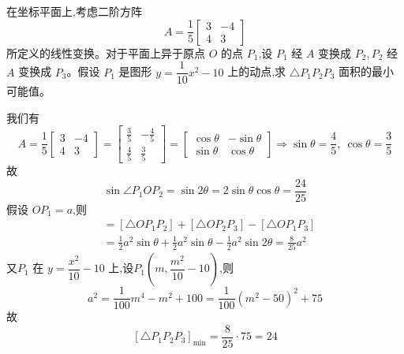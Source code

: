 \begin{questions}
    \question 在坐标平面上,考虑二阶方阵 
    \[
    A=\frac{1}{5}\begin{bmatrix}3&-4\\ 4&3\end{bmatrix}
    \]
    所定义的线性变换。对于平面上异于原点 $O$ 的点 $P_1$,设 $P_1$ 经 $A$ 变换成 $P_2,P_2$ 经 $A$ 变换成 $P_3$。假设 $P_1$ 是图形 $y=\dfrac{1}{10}x^{2}-10$ 上的动点,求 $\triangle P_1P_2P_3$ 面积的最小可能值。
    \begin{solution}
        我们有
        \[
        A = \frac{1}{5}\begin{bmatrix}3 & -4 \\ 4 & 3 \end{bmatrix} 
        = \begin{bmatrix} \frac{3}{5} & -\frac{4}{5} \\ \frac{4}{5} & \frac{3}{5} \end{bmatrix} 
        = \begin{bmatrix} \cos\theta & -\sin\theta \\ \sin\theta & \cos\theta \end{bmatrix}
        \Rightarrow \sin \theta = \frac{4}{5},\ \cos \theta = \frac{3}{5}
        \]
        故
        \[
        \sin \angle P_1OP_2 = \sin 2\theta = 2\sin\theta\cos\theta = \frac{24}{25}
        \]
        假设 $OP_1=a$,则
        \begin{align*}
        [\triangle P_1P_2P_3] &= [\triangle OP_1P_2] + [\triangle OP_2P_3] - [\triangle OP_1P_3]\\
        &= \frac{1}{2}a^2 \sin \theta + \frac{1}{2}a^2 \sin \theta - \frac{1}{2}a^2 \sin 2\theta 
        = \frac{8}{25}a^2
        \end{align*}
        又$P_1$  在 $y = \dfrac{x^2}{10} - 10$ 上,设$P_1\left(m, \dfrac{m^2}{10} - 10\right)$,则
        \[
        a^2 = \frac{1}{100}m^4 - m^2 + 100 = \frac{1}{100}(m^2 - 50)^2 + 75
        \]
        故
        \[
        [\triangle P_1P_2P_3]_{\min}=\frac{8}{25} \cdot 75=24
        \]
    \end{solution}


\end{questions}
